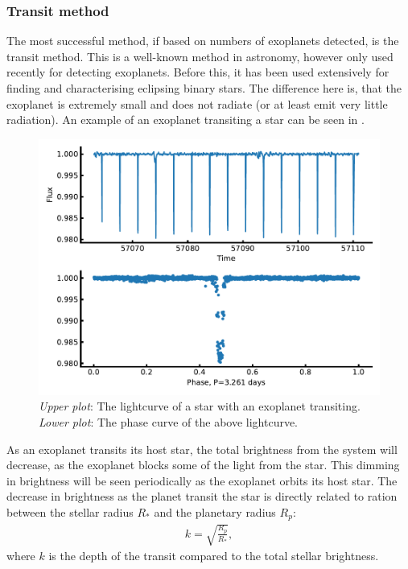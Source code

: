 \subsubsection{Transit method}
\label{sec:transitMethod}

The most successful method, if based on numbers of exoplanets detected, is the transit method. This
is a well-known method in astronomy, however only used recently for detecting exoplanets. Before
this, it has been used extensively for finding and characterising eclipsing binary stars. The
difference here is, that the exoplanet is extremely small and does not radiate (or at least emit
very little radiation). An example of an exoplanet transiting a star can be seen in
.

\begin{figure}[htpb!]
    \centering
    \includegraphics[width=1.0\linewidth]{figures/transitMethod.pdf}
    \caption{\emph{Upper plot}: The lightcurve of a star with an exoplanet transiting.
             \emph{Lower plot}: The phase curve of the above lightcurve.}
    \label{fig:transitMethod}
\end{figure}

As an exoplanet transits its host star, the total brightness from the system will decrease, as the
exoplanet blocks some of the light from the star. This dimming in brightness will be seen
periodically as the exoplanet orbits its host star. The decrease in brightness as the planet transit
the star is directly related to ration between the stellar radius $R_\ast$ and the planetary radius
$R_p$:
\begin{align}
  k = \sqrt{\frac{R_p}{R_\ast}},  \label{eq:transit}
\end{align}
where $k$ is the depth of the transit compared to the total stellar brightness.

